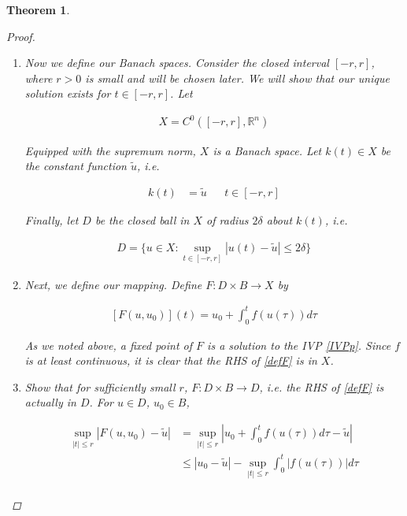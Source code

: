 \documentclass{article}
\newtheorem{theorem}{Theorem}[section]
\def\R{{\mathbb R}}
\begin{document}
\begin{theorem}
\begin{proof}
\begin{enumerate}
\begin{align*}
|f(u_1) - f(u_2)| \leq L |u_1 - u_2|
\end{align*}

Since $f$ is continuous, let

\[
C = \sup \{ f(u) : u \in B_{2 \delta}(\tilde{u}) \}
\]

Finally, let

\[
B = B_\delta(\tilde{u})
\]

\item Now we define our Banach spaces. Consider the closed interval $[-r, r]$, where $r > 0$ is small and will be chosen later. We will show that our unique solution exists for $t \in [-r, r]$. Let

\begin{align*}
X = C^0([-r, r], \R^n)
\end{align*}

Equipped with the supremum norm, $X$ is a Banach space. Let $k(t) \in X$ be the constant function $\tilde{u}$, i.e.

\begin{align*}
k(t) &= \tilde{u} && t \in [-r, r]
\end{align*}

Finally, let $D$ be the closed ball in $X$ of radius $2 \delta$ about $k(t)$, i.e.

\begin{align*}
D = \{ u \in X : \sup_{t \in [-r,r]} | u(t) - \tilde{u} | \leq 2 \delta \}
\end{align*}

\item Next, we define our mapping. Define $F: D \times B \rightarrow X$ by

\begin{align}\label{defF}
[F(u, u_0)](t) = u_0 + \int_0^t f(u(\tau)) d \tau
\end{align}

As we noted above, a fixed point of $F$ is a solution to the IVP \eqref{IVPp}. Since $f$ is at least continuous, it is clear that the RHS of \eqref{defF} is in $X$.

\item Show that for sufficiently small $r$, $F: D \times B \rightarrow D$, i.e. the RHS of \eqref{defF} is actually in $D$. For $u \in D$, $u_0 \in B$,

\begin{align*}
\sup_{|t| \leq r} |F(u, u_0) - \tilde{u}| &= 
\sup_{|t| \leq r} \left|u_0 + \int_0^t f(u(\tau)) d\tau - \tilde{u}\right| \\
&\leq |u_0 - \tilde{u}| - \sup_{|t| \leq r} \int_0^t |f(u(\tau))| d \tau \\
\end{align*}


\end{enumerate}
\end{proof}
\end{theorem}
\end{document}
